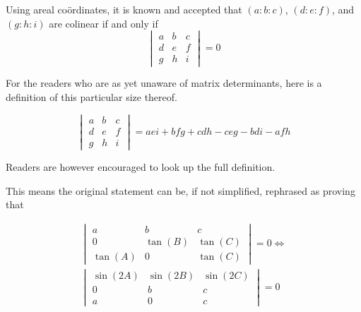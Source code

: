 \documentclass[11pt,a4paper]{report}
\begin{document}
\begin{multicols}{2}
		Using areal coördinates, it is known and accepted that \((a:b:c)\), \((d:e:f)\), and \((g:h:i)\) are colinear if and only if
		\[
		\begin{vmatrix}
		a&b&c\\
		d&e&f
		\\g&h&i
		\end{vmatrix}=0
		\]
		
		For the readers who are as yet unaware of matrix determinants, here is a definition of this particular size thereof.
		
		\[
		\begin{vmatrix}
		a&b&c\\
		d&e&f
		\\g&h&i
		\end{vmatrix}=aei+bfg+cdh-ceg-bdi-afh
		\]
		
		Readers are however encouraged to look up the full definition.
		
		This means the original statement can be, if not simplified, rephrased as proving that
		
		\[
		\begin{split}
		\begin{vmatrix}
		a&b&c\\
		0&\tan(B)&\tan(C)
		\\\tan(A)&0&\tan(C)
		\end{vmatrix}
		=0
		\iff{}
		\\
		\begin{vmatrix}
		\sin(2A)&\sin(2B)&\sin(2C)\\
		0&b&c\\
		a&0&c
		\end{vmatrix}
		=0
		\end{split}{}
		\]
		

\end{multicols}
\end{document}
